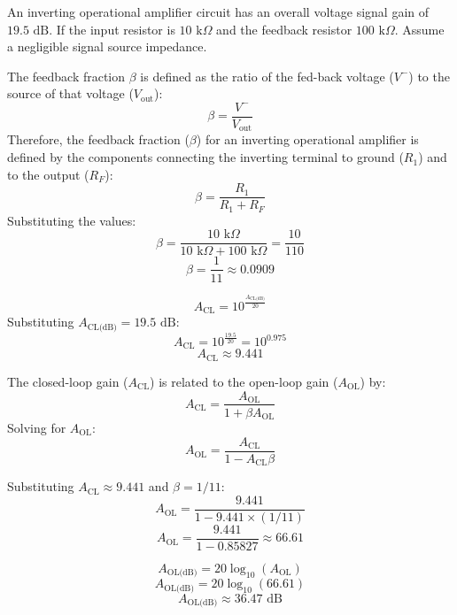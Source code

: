 
An inverting operational amplifier circuit has an overall voltage signal gain of 
$19.5 \text{ dB}$. If the input resistor is $10 \text{ k}\Omega$ and the feedback 
resistor $100 \text{ k}\Omega$.
Assume a negligible signal source impedance.


\begin{solutionblock}
The feedback fraction $\beta$ is defined as the ratio of the fed-back voltage ($V^-$) to the source of that voltage ($V_{\text{out}}$):
\[
\beta = \frac{V^-}{V_{\text{out}}}
\]
Therefore, the feedback fraction ($\beta$) for an inverting operational amplifier is defined by the components connecting the inverting terminal to ground ($R_1$) and to the output ($R_F$):
\[
\beta = \frac{R_1}{R_1 + R_F}
\]
Substituting the values:
\[
\beta = \frac{10 \text{ k}\Omega}{10 \text{ k}\Omega + 100 \text{ k}\Omega} = \frac{10}{110}
\]
\[
\beta = \frac{1}{11} \approx 0.0909
\]
\end{solutionblock}

\begin{solutionblock}

\[
A_{\text{CL}} = 10^{\frac{A_{\text{CL(dB)}}}{20}}
\]
Substituting $A_{\text{CL(dB)}} = 19.5 \text{ dB}$:
\[
A_{\text{CL}} = 10^{\frac{19.5}{20}} = 10^{0.975}
\]
\[
A_{\text{CL}} \approx 9.441
\]


The closed-loop gain ($A_{\text{CL}}$) is related to the open-loop gain ($A_{\text{OL}}$) by:
\[
A_{\text{CL}} = \frac{A_{\text{OL}}}{1 + \beta A_{\text{OL}}}
\]
Solving for $A_{\text{OL}}$:
\[
A_{\text{OL}} = \frac{A_{\text{CL}}}{1 - A_{\text{CL}} \beta}
\]


Substituting $A_{\text{CL}} \approx 9.441$ and $\beta = 1/11$:
\[
A_{\text{OL}} = \frac{9.441}{1 - 9.441 \times (1/11)}
\]
\[
A_{\text{OL}} = \frac{9.441}{1 - 0.85827} \approx 66.61
\]


\[
A_{\text{OL(dB)}} = 20 \log_{10} (A_{\text{OL}})
\]
\[
A_{\text{OL(dB)}} = 20 \log_{10} (66.61)
\]
\[
A_{\text{OL(dB)}} \approx 36.47 \text{ dB}
\]
\end{solutionblock}


